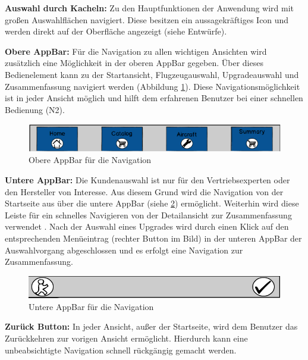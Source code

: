 \textbf{Auswahl durch Kacheln:} Zu den Hauptfunktionen der Anwendung wird mit großen Auswahlflächen navigiert. Diese besitzen ein aussagekräftiges Icon und werden direkt auf der Oberfläche angezeigt (siehe Entwürfe).  

\textbf{Obere AppBar:} Für die Navigation zu allen wichtigen Ansichten wird zusätzlich eine Möglichkeit in der oberen AppBar gegeben. Über dieses Bedienelement kann zu der Startansicht, Flugzeugauswahl, Upgradeauswahl und Zusammenfassung navigiert werden (Abbildung \ref{upperApp}). Diese Navigationsmöglichkeit ist in jeder Ansicht möglich und hilft dem erfahrenen Benutzer bei einer schnellen Bedienung (N2). \par
\begin{figure}[H]
\centering
\includegraphics[width=\hsize]{images/UpperAppBar}
\caption{Obere AppBar für die Navigation}
\label{upperApp}
\end{figure}
\textbf{Untere AppBar:} Die Kundenauswahl ist nur für den Vertriebsexperten oder den Hersteller von Interesse. Aus diesem Grund wird die Navigation von der Startseite aus über die untere AppBar (siehe \ref{lowerApp}) ermöglicht.  Weiterhin wird diese Leiste für ein schnelles Navigieren von der Detailansicht zur Zusammenfassung verwendet . Nach der Auswahl eines Upgrades wird durch einen Klick auf den entsprechenden Menüeintrag (rechter Button im Bild) in der unteren AppBar  der Auswahlvorgang abgeschlossen und es erfolgt eine Navigation zur Zusammenfassung.
\begin{figure}[H]
\centering
\includegraphics[width=\hsize]{images/LowerAppBar}
\caption{Untere AppBar für die Navigation}
\label{lowerApp}
\end{figure}
\textbf{Zurück Button:} In jeder Ansicht, außer der Startseite, wird dem Benutzer das Zurückkehren zur vorigen Ansicht ermöglicht. Hierdurch kann eine unbeabsichtigte Navigation schnell rückgängig gemacht werden.

